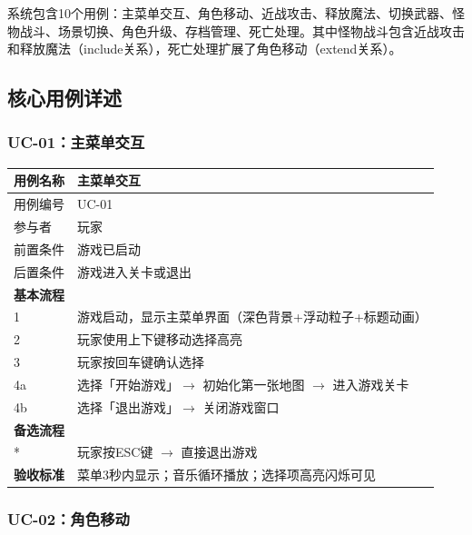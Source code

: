\documentclass[12pt,a4paper]{article}
\begin{document}
系统包含10个用例：主菜单交互、角色移动、近战攻击、释放魔法、切换武器、怪物战斗、场景切换、角色升级、存档管理、死亡处理。其中怪物战斗包含近战攻击和释放魔法（include关系），死亡处理扩展了角色移动（extend关系）。

\subsection{核心用例详述}

\subsubsection{UC-01：主菜单交互}

\begin{table}[htbp]
\centering
\begin{tabularx}{\textwidth}{lX}
\toprule
\textbf{用例名称} & 主菜单交互 \\
\midrule
用例编号 & UC-01 \\
参与者 & 玩家 \\
前置条件 & 游戏已启动 \\
后置条件 & 游戏进入关卡或退出 \\
\midrule
\textbf{基本流程} & \\
1 & 游戏启动，显示主菜单界面（深色背景+浮动粒子+标题动画） \\
2 & 玩家使用上下键移动选择高亮 \\
3 & 玩家按回车键确认选择 \\
4a & 选择「开始游戏」$\rightarrow$ 初始化第一张地图 $\rightarrow$ 进入游戏关卡 \\
4b & 选择「退出游戏」$\rightarrow$ 关闭游戏窗口 \\
\midrule
\textbf{备选流程} & \\
* & 玩家按ESC键 $\rightarrow$ 直接退出游戏 \\
\midrule
\textbf{验收标准} & 菜单3秒内显示；音乐循环播放；选择项高亮闪烁可见 \\
\bottomrule
\end{tabularx}
\end{table}

\subsubsection{UC-02：角色移动}
\end{document}

